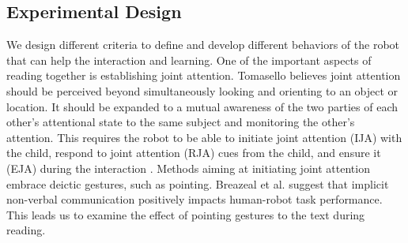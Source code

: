\documentclass{sigchi}
\begin{document}
\subsection{Experimental Design}
We design different criteria to define and develop different behaviors of the robot that can help the interaction and learning.
One of the important aspects of reading together is establishing joint attention. 
Tomasello \cite{tomasello1995joint} believes joint attention should be perceived beyond simultaneously looking and orienting to an object or location.  
It should be expanded to a mutual awareness of the two parties of each other's attentional state to the same subject and monitoring the other's attention.
This requires the robot to be able to initiate joint attention (IJA) with the child, respond to joint attention (RJA) cues from the child, and ensure it (EJA) during the interaction \cite{mundy2007individual,huang2010joint, kaplan2006challenges}.
Methods aiming at initiating joint attention embrace deictic gestures, such as pointing. 
Breazeal et al. \cite{breazeal2005effects} suggest that implicit non-verbal communication positively impacts human-robot task performance.  
This leads us to examine the effect of pointing gestures to the text during reading. 
\end{document}
